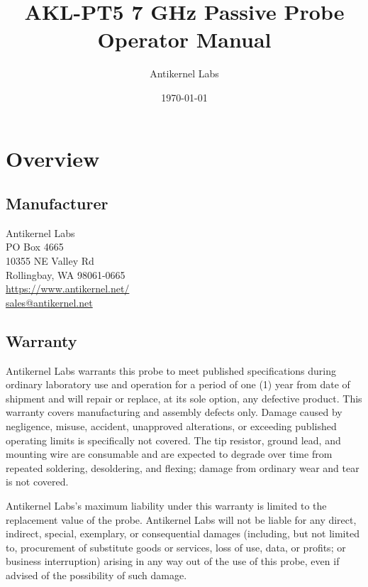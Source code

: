 \documentclass[11pt]{article}
\begin{document}
\title{AKL-PT5 7 GHz Passive Probe Operator Manual}
\author{Antikernel Labs}
\date{\today}

\maketitle
\thispagestyle{empty}

\pagebreak

\tableofcontents

\pagebreak

\section{Overview}

\subsection{Manufacturer}
Antikernel Labs \\
PO Box 4665 \\
10355 NE Valley Rd \\
Rollingbay, WA 98061-0665 \\
\href{https://www.antikernel.net/}{https://www.antikernel.net/} \\
\href{mailto:sales@antikernel.net}{sales@antikernel.net} \\

\subsection{Warranty}

Antikernel Labs warrants this probe to meet published specifications during ordinary laboratory use and operation for a
period of one (1) year from date of shipment and will repair or replace, at its sole option, any defective product.
This warranty covers manufacturing and assembly defects only. Damage caused by negligence, misuse, accident, unapproved
alterations, or exceeding published operating limits is specifically not covered. The tip resistor, ground lead, and
mounting wire are consumable and are expected to degrade over time from repeated soldering, desoldering, and flexing;
damage from ordinary wear and tear is not covered.

Antikernel Labs's maximum liability under this warranty is limited to the replacement value of the probe. Antikernel
Labs will not be liable for any direct, indirect, special, exemplary, or consequential damages (including, but not
limited to, procurement of substitute goods or services, loss of use, data, or profits; or business interruption)
arising in any way out of the use of this probe, even if advised of the possibility of such damage.
\end{document}

